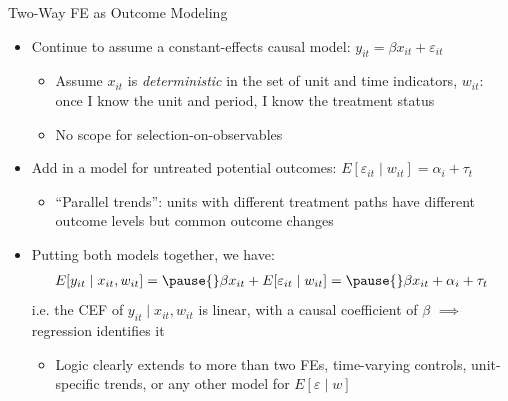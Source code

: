 \documentclass[11pt,english]{beamer}
\begin{document}
\begin{frame}{Two-Way FE as Outcome Modeling}

\vspace{0.2cm}
\begin{itemize}
\item Continue to assume a constant-effects causal model: $y_{it}=\beta x_{it}+\varepsilon_{it}$\smallskip
\begin{itemize}
\item Assume $x_{it}$ is \emph{deterministic} in the set of unit and time indicators, $w_{it}$: once I know the unit and period, I know the treatment status\smallskip
\item No scope for selection-on-observables 
\end{itemize}\bigskip\pause{}

\item Add in a model for untreated potential outcomes: $E[\varepsilon_{it}\mid w_{it}]=\alpha_i + \tau_t$\smallskip
\begin{itemize}
\item ``Parallel trends'': units with different treatment paths have different outcome levels but common outcome changes 
\end{itemize}\bigskip\pause{}

\item Putting both models together, we have:
\begin{align*}
E[y_{it}\mid x_{it},w_{it}] = \pause{}\beta x_{it} + E[\varepsilon_{it}\mid w_{it}]=\pause{} \beta x_{it}+\alpha_i + \tau_t
\end{align*}\pause{}
i.e. the CEF of $y_{it}\mid x_{it},w_{it}$ is linear, with a causal coefficient of $\beta$ $\implies$ regression identifies it\smallskip\pause{}
\begin{itemize}
\item Logic clearly extends to more than two FEs, time-varying controls, unit-specific trends, or any other model for $E[\varepsilon\mid w]$
\end{itemize}

\end{itemize}

\end{frame}
\end{document}
